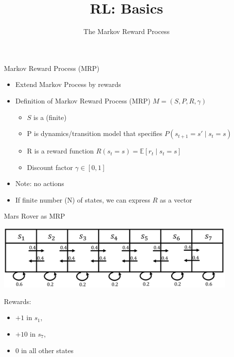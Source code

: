 


\title[Reinforcement Learning: Basics]{RL: Basics}
\subtitle{The Markov Reward Process}




	
	\maketitle

\begin{frame}[c]{Markov Reward Process (MRP)}

\begin{itemize}
	\item Extend Markov Process by rewards
	\item Definition of Markov Reward Process (MRP) $M =(S, P, R, \gamma)$
	\begin{itemize}
		\item $S$ is a (finite)
		\item P is dynamics/transition model that specifies $P(s_{t+1}=s' \mid s_t = s)$
		\item R is a reward function $R(s_t = s) = \mathbb{E}[r_t \mid s_t = s]$
		\item Discount factor $\gamma \in [0,1]$
	\end{itemize}
	\item Note: no actions
	\item If finite number (N) of states, we can express $R$ as a vector
\end{itemize}

\end{frame}
\begin{frame}[c]{Mars Rover as MRP}
	
\begin{center}
	\includegraphics[width=0.9\textwidth]{images/mars_rover_markov_process_2.png}
\end{center}

Rewards:
\begin{itemize}
	\item $+1$ in $s_1$, 
	\item $+10$ in $s_7$,
	\item $0$ in all other states
\end{itemize}
	
\end{frame}
